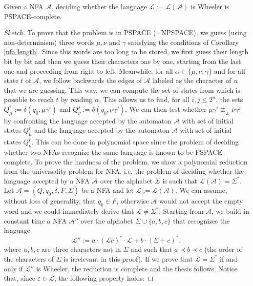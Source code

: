 \documentclass[runningheads]{llncs}
\newcommand{\la}[1]{\mathcal L(\mathcal #1)}
\begin{document}
\begin{proposition}
\label{pspace}
Given a NFA $\mathcal A$, deciding whether the language $\mathcal L := \la A$ is Wheeler is PSPACE-complete.
\end{proposition}
\begin{proof}[Sketch]
To prove that the problem is in PSPACE (=NPSPACE), we guess (using non-determinism) three words $\mu, \nu$ and $\gamma$ satisfying the conditions of Corollary \ref{nfa length}. Since this words are too long to be stored, we first guess their length bit by bit and then we guess their characters one by one, starting from the last one and proceeding from right to left. Meanwhile, for all $\alpha \in \{\mu, \nu, \gamma\}$ and for all state $t$ of $\mathcal A$, we follow backwards the edges of $\mathcal A$ labeled as the character of $\alpha$ that we are guessing. This way, we can compute the set of states from which is possible to reach $t$ by reading $\alpha$. This allows us to find, for all $i,j \le 2^n$, the sets $Q^i_{\mu} := \delta(q_0, \mu\gamma^i)$ and $Q^j_\nu := \delta(q_0, \nu\gamma^j)$. We can then test whether $\mu\gamma^i \not\equiv_\mathcal L \nu\gamma^j$ by confronting the language accepted by the automaton $\mathcal A$ with set of initial states $Q^i_{\mu}$ and the language accepted by the automaton $\mathcal A$ with set of initial states $Q^i_{\nu}$. This can be done in polynomial space since the problem of deciding whether two NFAs recognize the same language is known to be PSPACE-complete.
\vskip 5mm
To prove the hardness of the problem, we show a polynomial reduction from the universality problem for NFA, i.e. the problem of deciding whether the language accepted by a NFA $\mathcal A$ over the alphabet $\Sigma$ is such that $\la A = \Sigma^*$.  
\\Let $\mathcal A = (Q, q_0,\delta, F, \Sigma)$ be a NFA and let $\mathcal L := \la A$. We can assume, without loss of generality, that $q_0 \in F$, otherwise $\mathcal A$ would not accept the empty word and we could immediately derive that $\mathcal L \ne \Sigma^*$. Starting from $\mathcal A$, we build in constant time a NFA $\mathcal A''$ over the alphabet $\Sigma \cup \{a,b,c\}$ that recognizes the language 
\[\mathcal L'' := a\cdot(\mathcal Lc)^*\cdot\mathcal L + b\cdot (\Sigma + c)^*,
\]
where $a,b,c$ are three characters not in $\Sigma$ and such that $a \prec b \prec c$ (the order of the characters of $\Sigma$ is irrelevant in this proof). If we prove that $\mathcal L = \Sigma^*$ if and only if $\mathcal L''$ is Wheeler, the reduction is complete and the thesis follows. Notice that, since $\varepsilon \in \mathcal L$, the following property holds:

\end{proof}
\end{document}
